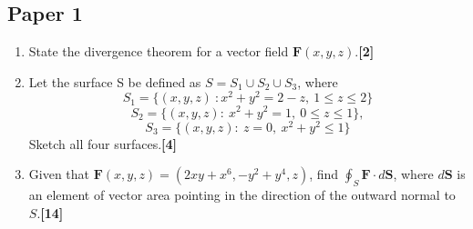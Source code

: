\documentclass[a4paper]{article}
\begin{document}
\subsection{Paper 1}
\begin{qns}\leavevmode
\begin{enumerate}[label=(\alph*)]
    \item State the divergence theorem for a vector field $\mathbf{F}(x, y, z)$.\hfill \textbf{[2]}
    \item Let the surface S be defined as $S=S_1\cup S_2\cup S_3$, where
$$S_1=\{(x,y,z)~:x^2+y^2=2-z,~1\leq z\leq 2\}$$
$$S_2 =\{(x, y, z) :~x^2 + y^2 = 1,~0\leq z\leq  1\},$$
$$S_3 =\{(x, y, z) :~z = 0,~x^2 + y^2\leq 1\}$$
Sketch all four surfaces.\hfill \textbf{[4]}
\item Given that $\mathbf{F}(x, y, z) = (2xy+x^6, −y^2+y^4, z)$, find $\oint_S\mathbf{F}\cdot d\mathbf{S}$, where $d\mathbf{S}$ is an element of vector area pointing in the direction of the outward normal to $S$.\hfill \textbf{[14]}
\end{enumerate}
\end{qns}
\end{document}

